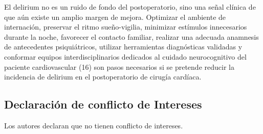 El delirium no es un ruido de fondo del postoperatorio, sino una señal clínica de que aún existe un amplio margen de mejora. Optimizar el ambiente de internación, preservar el ritmo sueño-vigilia, minimizar estímulos innecesarios durante la noche, favorecer el contacto familiar, realizar una adecuada anamnesis de antecedentes psiquiátricos, utilizar herramientas diagnósticas validadas y conformar equipos interdisciplinarios dedicados al cuidado neurocognitivo del paciente cardiovascular (16) son pasos necesarios si se pretende reducir la incidencia de delirium en el postoperatorio de cirugía cardíaca.

\subsection{Declaración de conflicto de Intereses}
Los autores declaran que no tienen conflicto de intereses.



